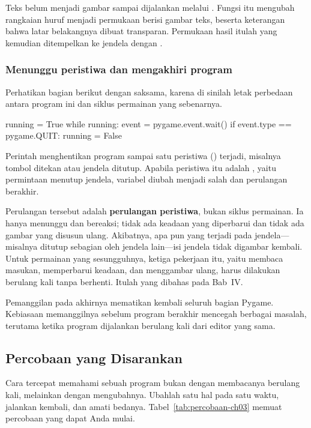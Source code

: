 Teks belum menjadi gambar sampai dijalankan melalui .
Fungsi itu mengubah rangkaian huruf menjadi permukaan berisi gambar teks,
beserta keterangan bahwa latar belakangnya dibuat transparan. Permukaan hasil
 itulah yang kemudian ditempelkan ke jendela dengan .

\subsubsection{Menunggu peristiwa dan mengakhiri program}

Perhatikan bagian berikut dengan saksama, karena di sinilah letak perbedaan
antara program ini dan siklus permainan yang sebenarnya.

\begin{kodekeluaran}
running = True
while running:
    event = pygame.event.wait()
    if event.type == pygame.QUIT:
        running = False
\end{kodekeluaran}

Perintah  menghentikan program sampai satu peristiwa
() terjadi, misalnya tombol ditekan atau jendela ditutup.
Apabila peristiwa itu adalah , yaitu permintaan menutup jendela,
variabel  diubah menjadi salah dan perulangan berakhir.

Perulangan tersebut adalah \textbf{perulangan peristiwa}, bukan siklus
permainan. Ia hanya menunggu dan bereaksi; tidak ada keadaan yang diperbarui
dan tidak ada gambar yang disusun ulang. Akibatnya, apa pun yang terjadi pada
jendela---misalnya ditutup sebagian oleh jendela lain---isi jendela tidak
digambar kembali. Untuk permainan yang sesungguhnya, ketiga pekerjaan itu,
yaitu membaca masukan, memperbarui keadaan, dan menggambar ulang, harus
dilakukan berulang kali tanpa berhenti. Itulah yang dibahas pada Bab~IV.

Pemanggilan  pada akhirnya mematikan kembali seluruh
bagian Pygame. Kebiasaan memanggilnya sebelum program berakhir mencegah
berbagai masalah, terutama ketika program dijalankan berulang kali dari
editor yang sama.

\subsection{Percobaan yang Disarankan}

Cara tercepat memahami sebuah program bukan dengan membacanya berulang kali,
melainkan dengan mengubahnya. Ubahlah satu hal pada satu waktu, jalankan
kembali, dan amati bedanya. Tabel~\ref{tab:percobaan-ch03} memuat percobaan
yang dapat Anda mulai.

